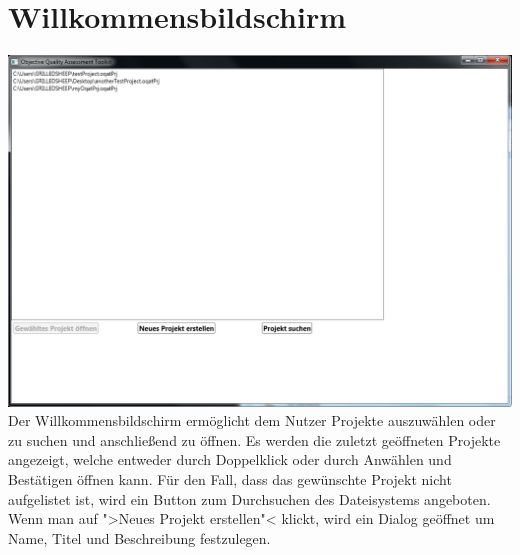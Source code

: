\chapter{Willkommensbildschirm}
\includegraphics[scale=0.55]{bilder/Welcome.png}\\[5ex]


Der Willkommensbildschirm ermöglicht dem Nutzer Projekte auszuwählen oder zu suchen und anschließend zu öffnen. Es werden die zuletzt geöffneten Projekte angezeigt, welche entweder durch Doppelklick oder durch Anwählen und Bestätigen öffnen kann. Für den Fall, dass das gewünschte Projekt nicht aufgelistet ist, wird ein Button zum Durchsuchen des Dateisystems angeboten. Wenn man auf ">Neues Projekt erstellen"< klickt, wird ein Dialog geöffnet um Name, Titel und Beschreibung festzulegen.